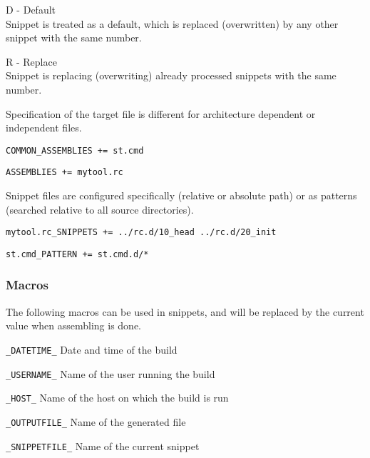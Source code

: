 \begin{description}
\item D - Default\\
Snippet is treated as a default, which is replaced (overwritten) by any other snippet with
the same number.

\item R - Replace\\
Snippet is replacing (overwriting) already processed snippets with the same number.

\end{description}

Specification of the target file is different for architecture dependent or independent files.

\begin{description}
\item {}\verb|COMMON_ASSEMBLIES += st.cmd|
\item {}\verb|ASSEMBLIES += mytool.rc|

\end{description}

Snippet files are configured specifically (relative or absolute path) or as patterns
(searched relative to all source directories).

\begin{description}
\item \verb|mytool.rc_SNIPPETS += ../rc.d/10_head ../rc.d/20_init|
\item \verb|st.cmd_PATTERN += st.cmd.d/*|

\end{description}

\subsubsection{Macros}
The following macros can be used in snippets, and will be replaced by the current value
when assembling is done.

\begin{description}
\item \verb|_DATETIME_|
Date and time of the build

\item \verb|_USERNAME_|
Name of the user running the build

\item \verb|_HOST_|
Name of the host on which the build is run

\item \verb|_OUTPUTFILE_|
Name of the generated file

\item \verb|_SNIPPETFILE_|
Name of the current snippet

\end{description}

